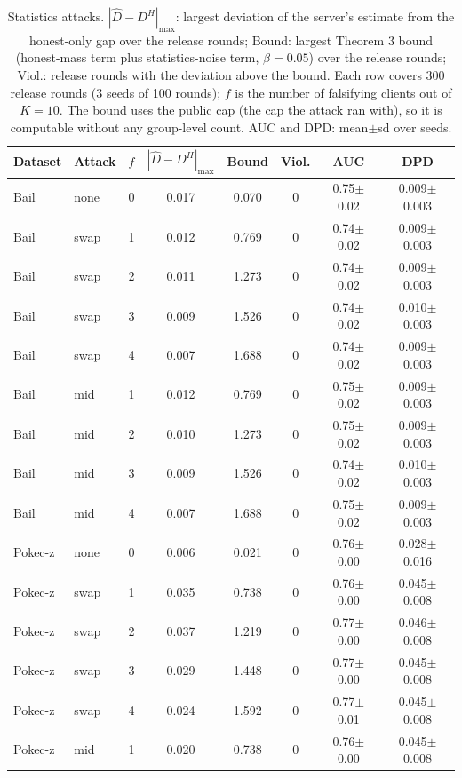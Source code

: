 \begin{table}[tbp]
\centering
\footnotesize
\caption{Statistics attacks. $|\widehat{D}-D^H|_{\max}$: largest deviation of the server's estimate from the honest-only gap over the release rounds; Bound: largest Theorem 3 bound (honest-mass term plus statistics-noise term, $\beta=0.05$) over the release rounds; Viol.: release rounds with the deviation above the bound. Each row covers 300 release rounds (3 seeds of 100 rounds); $f$ is the number of falsifying clients out of $K=10$. The bound uses the public cap (the cap the attack ran with), so it is computable without any group-level count. AUC and DPD: mean$\pm$sd over seeds.}
\label{tab:e4_stat_attacks}
\begin{tabular}{llcccccc}
\toprule
Dataset & Attack & $f$ & $|\widehat{D}-D^H|_{\max}$ & Bound & Viol. & AUC & DPD \\
\midrule
Bail & none & 0 & 0.017 & 0.070 & 0 & 0.75$\pm$0.02 & 0.009$\pm$0.003 \\
Bail & swap & 1 & 0.012 & 0.769 & 0 & 0.74$\pm$0.02 & 0.009$\pm$0.003 \\
Bail & swap & 2 & 0.011 & 1.273 & 0 & 0.74$\pm$0.02 & 0.009$\pm$0.003 \\
Bail & swap & 3 & 0.009 & 1.526 & 0 & 0.74$\pm$0.02 & 0.010$\pm$0.003 \\
Bail & swap & 4 & 0.007 & 1.688 & 0 & 0.74$\pm$0.02 & 0.009$\pm$0.003 \\
Bail & mid & 1 & 0.012 & 0.769 & 0 & 0.75$\pm$0.02 & 0.009$\pm$0.003 \\
Bail & mid & 2 & 0.010 & 1.273 & 0 & 0.75$\pm$0.02 & 0.009$\pm$0.003 \\
Bail & mid & 3 & 0.009 & 1.526 & 0 & 0.74$\pm$0.02 & 0.010$\pm$0.003 \\
Bail & mid & 4 & 0.007 & 1.688 & 0 & 0.75$\pm$0.02 & 0.009$\pm$0.003 \\
Pokec-z & none & 0 & 0.006 & 0.021 & 0 & 0.76$\pm$0.00 & 0.028$\pm$0.016 \\
Pokec-z & swap & 1 & 0.035 & 0.738 & 0 & 0.76$\pm$0.00 & 0.045$\pm$0.008 \\
Pokec-z & swap & 2 & 0.037 & 1.219 & 0 & 0.77$\pm$0.00 & 0.046$\pm$0.008 \\
Pokec-z & swap & 3 & 0.029 & 1.448 & 0 & 0.77$\pm$0.00 & 0.045$\pm$0.008 \\
Pokec-z & swap & 4 & 0.024 & 1.592 & 0 & 0.77$\pm$0.01 & 0.045$\pm$0.008 \\
Pokec-z & mid & 1 & 0.020 & 0.738 & 0 & 0.76$\pm$0.00 & 0.045$\pm$0.008 \\

\end{tabular}
\end{table}
